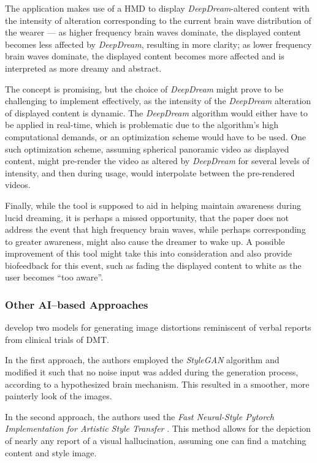 The application makes use of a \ac{HMD} to display \textit{DeepDream}-altered \autocite{mordvintsev2015inceptionism} content with the intensity of alteration corresponding to the current brain wave distribution of the wearer --- as higher frequency brain waves dominate, the displayed content becomes less affected by \textit{DeepDream}, resulting in more clarity; as lower frequency brain waves dominate, the displayed content becomes more affected and is interpreted as more dreamy and abstract.

The concept is promising, but the choice of \textit{DeepDream} might prove to be challenging to implement effectively, as the intensity of the \textit{DeepDream} alteration of displayed content is dynamic. The \textit{DeepDream} algorithm would either have to be applied in real-time, which is problematic due to the algorithm's high computational demands, or an optimization scheme would have to be used. One such optimization scheme, assuming spherical panoramic video as displayed content, might pre-render the video as altered by \textit{DeepDream} for several levels of intensity, and then during usage, would interpolate between the pre-rendered videos.

Finally, while the tool is supposed to aid in helping maintain awareness during lucid dreaming, it is perhaps a missed opportunity, that the paper does not address the event that high frequency brain waves, while perhaps corresponding to greater awareness, might also cause the dreamer to wake up. A possible improvement of this tool might take this into consideration and also provide biofeedback for this event, such as fading the displayed content to white as the user becomes ``too aware''.

\subsubsection{Other AI--based Approaches}
\textcite{schartner2020neural} develop two models for generating image distortions reminiscent of verbal reports from clinical trials of \ac{DMT}.

In the first approach, the authors employed the \textit{StyleGAN} algorithm \autocite{karras2019cvpr} and modified it such that no noise input was added during the generation process, according to a hypothesized brain mechanism. This resulted in a smoother, more painterly look of the images.

In the second approach, the authors used the \textit{Fast Neural-Style Pytorch Implementation for Artistic Style Transfer} \autocite{johnson2016perceptual}. This method allows for the depiction of nearly any report of a visual hallucination, assuming one can find a matching content and style image.

